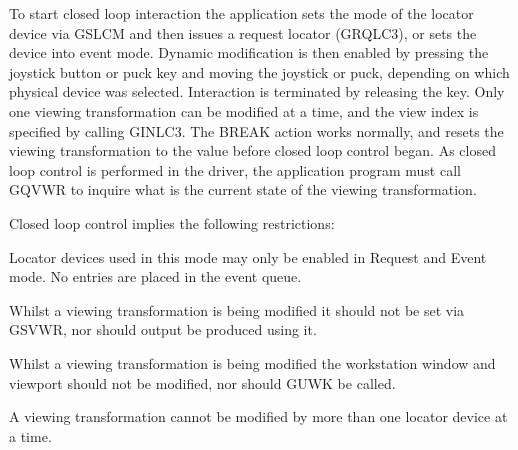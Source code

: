 To start closed loop interaction the application sets the mode of the
locator device via GSLCM and then issues a request locator (GRQLC3),
or sets the device into event mode.
Dynamic modification is then enabled by pressing the joystick button or
puck key and moving the joystick or puck, depending on which physical
device was selected. Interaction is terminated by releasing the key.
Only one viewing transformation can be modified at a time, and the
view index is specified by calling GINLC3.
The BREAK action  works normally, and resets the viewing transformation
to the value before closed loop control began.
As closed loop control is performed in the driver, the application program
must call GQVWR to inquire what is the current state of the
viewing transformation.
 
Closed loop control implies the following restrictions:
\begin{UL}
\item Locator devices used in this mode may only be enabled in Request and
Event mode. No entries are placed in the event queue.
\item Whilst a viewing transformation is being modified it should not be
set via GSVWR, nor should output be produced using it.
\item Whilst a viewing transformation is being modified the workstation
window and viewport should not be modified, nor should GUWK be called.
\item A viewing transformation cannot be modified by more than one
locator device at a time.
\end{UL}
